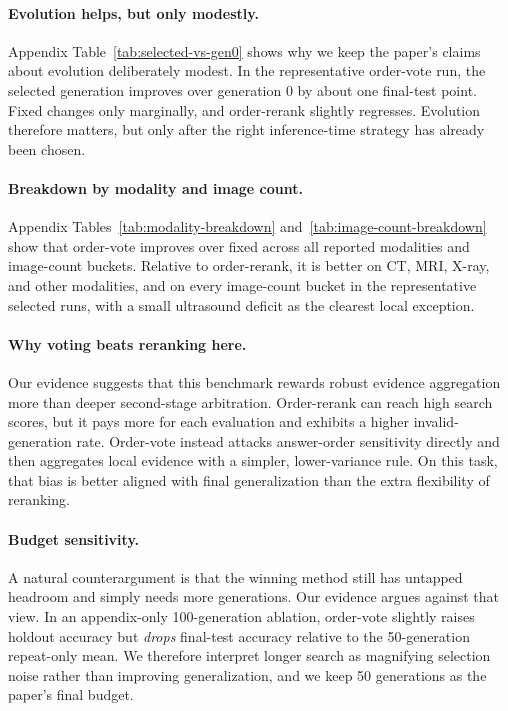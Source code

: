 \documentclass[11pt]{article}
\begin{document}
\paragraph{Evolution helps, but only modestly.}
Appendix Table~\ref{tab:selected-vs-gen0} shows why we keep the paper's claims about evolution deliberately modest. In the representative order-vote run, the selected generation improves over generation 0 by about one final-test point. Fixed changes only marginally, and order-rerank slightly regresses. Evolution therefore matters, but only after the right inference-time strategy has already been chosen.

\paragraph{Breakdown by modality and image count.}
Appendix Tables~\ref{tab:modality-breakdown} and~\ref{tab:image-count-breakdown} show that order-vote improves over fixed across all reported modalities and image-count buckets. Relative to order-rerank, it is better on CT, MRI, X-ray, and other modalities, and on every image-count bucket in the representative selected runs, with a small ultrasound deficit as the clearest local exception.

\paragraph{Why voting beats reranking here.}
Our evidence suggests that this benchmark rewards robust evidence aggregation more than deeper second-stage arbitration. Order-rerank can reach high search scores, but it pays more for each evaluation and exhibits a higher invalid-generation rate. Order-vote instead attacks answer-order sensitivity directly and then aggregates local evidence with a simpler, lower-variance rule. On this task, that bias is better aligned with final generalization than the extra flexibility of reranking.

\paragraph{Budget sensitivity.}
A natural counterargument is that the winning method still has untapped headroom and simply needs more generations. Our evidence argues against that view. In an appendix-only 100-generation ablation, order-vote slightly raises holdout accuracy but \emph{drops} final-test accuracy relative to the 50-generation repeat-only mean. We therefore interpret longer search as magnifying selection noise rather than improving generalization, and we keep 50 generations as the paper's final budget.
\end{document}

